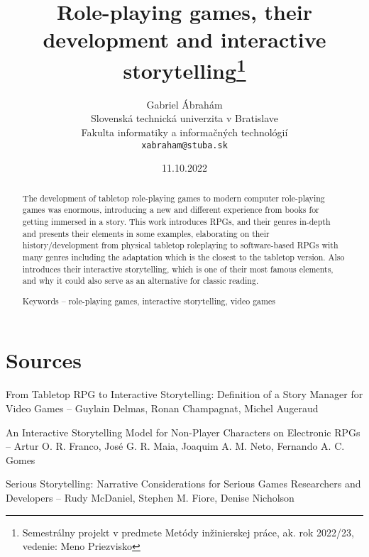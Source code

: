 \documentclass[10pt,twoside,english,a4paper]{article}
\title{Role-playing games, their development and interactive storytelling\thanks{Semestrálny projekt v predmete Metódy inžinierskej práce, ak. rok 2022/23, vedenie: Meno Priezvisko}} %
\author{Gabriel Ábrahám\\[2pt]
	{\small Slovenská technická univerzita v Bratislave}\\
	{\small Fakulta informatiky a informačných technológií}\\
	{\small \texttt{xabraham@stuba.sk}}
	}
\date{\small 11.10.2022}
\begin{document}
\maketitle

\begin{abstract}
The development of tabletop role-playing games to modern 
computer role-playing games was enormous, introducing a new and 
different experience from books for getting immersed in a story. This 
work introduces RPGs, and their genres in-depth and presents their 
elements in some examples, elaborating on their 
history/development from physical tabletop roleplaying to software-based RPGs with many genres including the adaptation which is the 
closest to the tabletop version. Also introduces their interactive 
storytelling, which is one of their most famous elements, and why it 
could also serve as an alternative for classic reading.

Keywords – role-playing games, interactive storytelling, video games
\end{abstract}




\section{Sources}


From Tabletop RPG to Interactive Storytelling: Definition of a Story 
Manager for Video Games – Guylain Delmas, Ronan Champagnat, Michel 
Augeraud

An Interactive Storytelling Model for Non-Player Characters on Electronic 
RPGs – Artur O. R. Franco, José G. R. Maia, Joaquim A. M. Neto, Fernando 
A. C. Gomes

Serious Storytelling: Narrative Considerations for Serious Games 
Researchers and Developers – Rudy McDaniel, Stephen M. Fiore, Denise 
Nicholson
\end{document}
